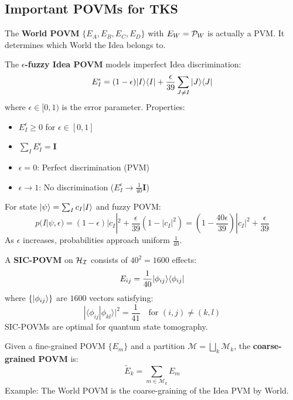 \subsection{Important POVMs for TKS}

\begin{definition}
\label{def:world-povm-v73}
The \textbf{World POVM} $\{E_A, E_B, E_C, E_D\}$ with $E_W = \mathcal{P}_W$ is actually a PVM. It determines which World the Idea belongs to.
\end{definition}

\begin{definition}
\label{def:fuzzy-idea-povm}
The \textbf{$\epsilon$-fuzzy Idea POVM} models imperfect Idea discrimination:
\[
E_I^\epsilon = (1 - \epsilon)|I\rangle\langle I| + \frac{\epsilon}{39} \sum_{J \neq I} |J\rangle\langle J|
\]
where $\epsilon \in [0, 1)$ is the error parameter. Properties:
\begin{itemize}
  \item $E_I^\epsilon \geq 0$ for $\epsilon \in [0, 1]$
  \item $\sum_I E_I^\epsilon = \mathbf{I}$
  \item $\epsilon = 0$: Perfect discrimination (PVM)
  \item $\epsilon \to 1$: No discrimination ($E_I^\epsilon \to \frac{1}{40}\mathbf{I}$)
\end{itemize}
\end{definition}

\begin{proposition}
\label{prop:fuzzy-probs}
For state $|\psi\rangle = \sum_I c_I |I\rangle$ and fuzzy POVM:
\[
p(I|\psi, \epsilon) = (1 - \epsilon)|c_I|^2 + \frac{\epsilon}{39}(1 - |c_I|^2) = (1 - \frac{40\epsilon}{39})|c_I|^2 + \frac{\epsilon}{39}
\]
As $\epsilon$ increases, probabilities approach uniform $\frac{1}{40}$.
\end{proposition}

\begin{definition}
\label{def:sic-povm}
A \textbf{SIC-POVM} on $\mathcal{H}_{\mathcal{I}}$ consists of $40^2 = 1600$ effects:
\[
E_{ij} = \frac{1}{40} |\phi_{ij}\rangle\langle \phi_{ij}|
\]
where $\{|\phi_{ij}\rangle\}$ are $1600$ vectors satisfying:
\[
|\langle\phi_{ij}|\phi_{kl}\rangle|^2 = \frac{1}{41} \quad \text{for } (i,j) \neq (k,l)
\]
SIC-POVMs are optimal for quantum state tomography.
\end{definition}

\begin{definition}
\label{def:coarse-povm}
Given a fine-grained POVM $\{E_m\}$ and a partition $\mathcal{M} = \bigsqcup_k \mathcal{M}_k$, the \textbf{coarse-grained POVM} is:
\[
\tilde{E}_k = \sum_{m \in \mathcal{M}_k} E_m
\]
Example: The World POVM is the coarse-graining of the Idea PVM by World.
\end{definition}

